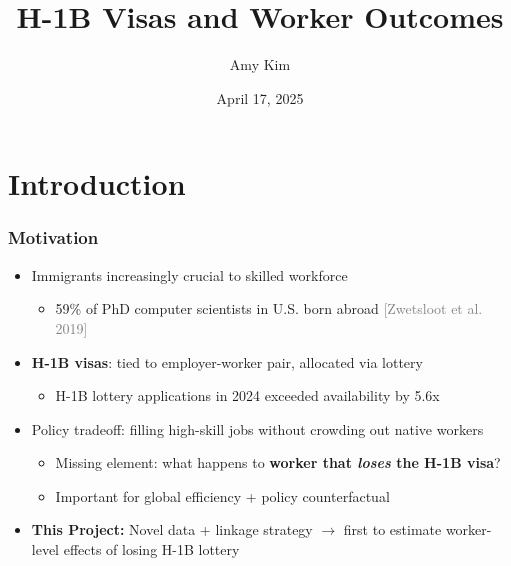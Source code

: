 \documentclass[xcolor=dvipsnames, compress, 12pt, aspectratio=169, handout]{beamer}
\title{H-1B Visas and Worker Outcomes}
\author{Amy Kim}
\date{April 17, 2025}
\begin{document}
\begin{frame}[plain]
    \titlepage
    \addtocounter{framenumber}{-1}
\end{frame}

\section{Introduction}
\begin{frame}
    \frametitle{Motivation}
    \begin{itemize}
        \item Immigrants increasingly crucial to skilled workforce
        \begin{itemize}
            \item 59\% of PhD computer scientists in U.S. born abroad \textcolor{gray}{[Zwetsloot et al. 2019]}
        \end{itemize}
        \vspace{4mm}
        \item \textbf{H-1B visas}: tied to employer-worker pair, allocated via lottery
        \begin{itemize}
            \item H-1B lottery applications in 2024 exceeded availability by 5.6x 
        \end{itemize}
        \vspace{4mm}
        \item Policy tradeoff: filling high-skill jobs without crowding out native workers
        \begin{itemize}
            \item Missing element: what happens to \textbf{worker that \textit{loses} the H-1B visa}?
            \item Important for global efficiency + policy counterfactual 
        \end{itemize}
        \vspace{4mm}
        \item \textcolor{maincolor}{\textbf{This Project:}} Novel data + linkage strategy $\rightarrow$ first to estimate worker-level effects of losing H-1B lottery
    \end{itemize}
\end{frame}
\end{document}
